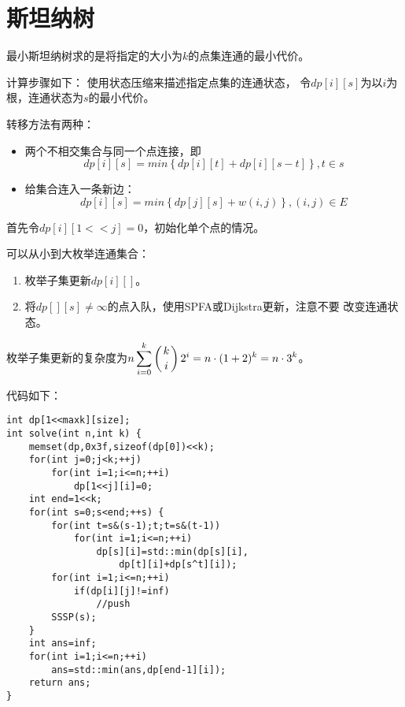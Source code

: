 \section{斯坦纳树}
最小斯坦纳树求的是将指定的大小为$k$的点集连通的最小代价。

计算步骤如下：
使用状态压缩来描述指定点集的连通状态，
令$dp[i][s]$为以$i$为根，连通状态为$s$的最小代价。

转移方法有两种：
\begin{itemize}
    \item 两个不相交集合与同一个点连接，即
    \begin{displaymath}
        dp[i][s]=min\left\{dp[i][t]+dp[i][s-t]\right\},t\in s
    \end{displaymath}
    \item 给集合连入一条新边：
    \begin{displaymath}
        dp[i][s]=min\left\{dp[j][s]+w(i,j)\right\},(i,j)\in E
    \end{displaymath}
\end{itemize}

首先令$dp[i][1<<j]=0$，初始化单个点的情况。

可以从小到大枚举连通集合：
\begin{enumerate}
    \item 枚举子集更新$dp[i][]$。
    \item 将$dp[][s]\neq \infty$的点入队，使用SPFA或Dijkstra更新，注意不要
    改变连通状态。
\end{enumerate}

枚举子集更新的复杂度为$\displaystyle n\sum_{i=0}^k{\left(k \atop i\right)2^i}=
n\cdot(1+2)^k=n\cdot 3^k$。

代码如下：
\begin{lstlisting}
int dp[1<<maxk][size];
int solve(int n,int k) {
    memset(dp,0x3f,sizeof(dp[0])<<k);
    for(int j=0;j<k;++j)
        for(int i=1;i<=n;++i)
            dp[1<<j][i]=0;
    int end=1<<k;
    for(int s=0;s<end;++s) {
        for(int t=s&(s-1);t;t=s&(t-1))
            for(int i=1;i<=n;++i)
                dp[s][i]=std::min(dp[s][i],
                    dp[t][i]+dp[s^t][i]);
        for(int i=1;i<=n;++i)
            if(dp[i][j]!=inf)
                //push
        SSSP(s);
    }
    int ans=inf;
    for(int i=1;i<=n;++i)
        ans=std::min(ans,dp[end-1][i]);
    return ans;
}
\end{lstlisting}
